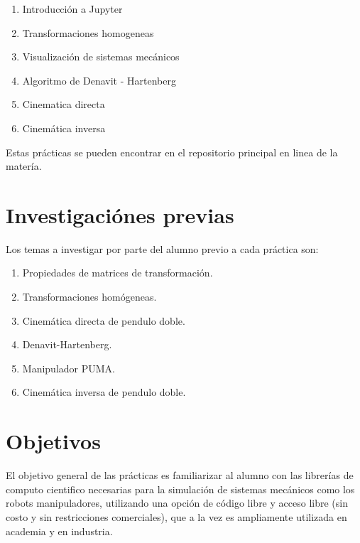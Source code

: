 	\begin{enumerate}
		\item Introducción a Jupyter
		\item Transformaciones homogeneas
		\item Visualización de sistemas mecánicos
		\item Algoritmo de Denavit - Hartenberg
		\item Cinematica directa
		\item Cinemática inversa
	\end{enumerate}

	Estas prácticas se pueden encontrar en el repositorio principal en linea de la matería\cite{github:cinematica}.


\section{Investigaciónes previas}

	Los temas a investigar por parte del alumno previo a cada práctica son:

	\begin{enumerate}
		\item Propiedades de matrices de transformación\cite{apuntesdin:2014}.
		\item Transformaciones homógeneas\cite{apuntescin:2014}.
		\item Cinemática directa de pendulo doble\cite{apuntesdin:2014}.
		\item Denavit-Hartenberg\cite{robotica:2005}.
		\item Manipulador PUMA\cite{apuntescin:2014}.
		\item Cinemática inversa de pendulo doble\cite{apuntescin:2014}.
	\end{enumerate}


\section{Objetivos}

	El objetivo general de las prácticas es familiarizar al alumno con las librerías de computo cientifico necesarias para la simulación de sistemas mecánicos como los robots manipuladores, utilizando una opción de código libre y acceso libre (sin costo y sin restricciones comerciales), que a la vez es ampliamente utilizada en academia y en industria.

